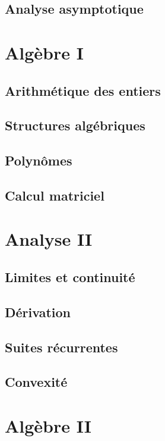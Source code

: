 \documentclass[a4paper,french,bookmarks]{book}
\begin{document}
    \chapter{Analyse asymptotique}
    
    \part{Algèbre I}
    
    \chapter{Arithmétique des entiers}
    
    \chapter{Structures algébriques}
    
    \chapter{Polynômes}
    
    \chapter{Calcul matriciel}
    
    \part{Analyse II}
    
    \chapter{Limites et continuité}
    
    \chapter{Dérivation}
    
    \chapter{Suites récurrentes}
    
    \chapter{Convexité}
    
    \part{Algèbre II}
    
\end{document}
